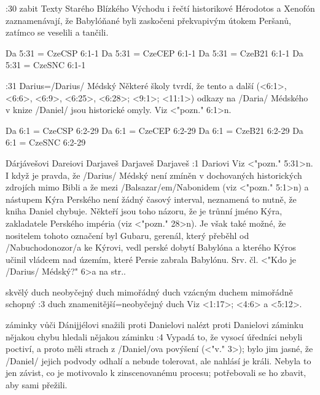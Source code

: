 :30 {zabit} Texty Starého Blízkého Východu i řečtí historikové Hérodotos a Xenofón zaznamenávají, že Babylóňané byli zaskočeni překvapivým útokem Peršanů, zatímco se veselili a tančili.

\renum Da 5:31 = CzeCSP 6:1-1
\renum Da 5:31 = CzeCEP 6:1-1
\renum Da 5:31 = CzeB21 6:1-1
\renum Da 5:31 = CzeSNC 6:1-1 

:31 {Darius}={\x/Darius/ Médský} Některé školy tvrdí, že tento a další 
(<6:1>, <6:6>, <6:9>, <6:25>, <6:28>; <9:1>; <11:1>)     
odkazy na \x/Daria/ Médského v knize \x/Daniel/ jsou historické omyly. Viz <"pozn." 6:1>n. 

\renum Da 6:1 = CzeCSP 6:2-29
\renum Da 6:1 = CzeCEP 6:2-29
\renum Da 6:1 = CzeB21 6:2-29
\renum Da 6:1 = CzeSNC 6:2-29

    {Dárjávešovi}   %
    {Dareiovi}   %
    {Darjaveš}  %
    {Darjaveš}  %
    {Darjaveš}   %
:1 {Dariovi} Viz <"pozn." 5:31>n.      
I když je pravda, že \x/Darius/ Médský není zmíněn v dochovaných historických zdrojích mimo Bibli a že mezi \x/Balsazar/em/Nabonidem (viz <"pozn." 5:1>n) a nástupem Kýra Perského není žádný časový interval, neznamená to nutně, že kniha Daniel chybuje. Někteří jsou toho názoru, že  je trůnní jméno Kýra, zakladatele Perského impéria (viz <"pozn." 28>n). 
Je však také možné, že nositelem tohoto označení byl Gubaru, gerenál, který přeběhl od  \x/Nabuchodonozor/a ke Kýrovi, vedl perské dobytí Babylóna a kterého  Kýros učinil vládcem nad územím, které Persie zabrala Babylónu. 
Srv. čl. <"Kdo je \x/Darius/ Médský?" 6>a na str.\pg.


    {skvělý duch}   %
    {neobyčejný duch}   %
    {mimořádný duch}  %
    {vzácným duchem}  %
    {mimořádně schopný}   %
:3 {duch znamenitější}={neobyčejný duch} Viz  <1:17>;  <4:6> a <5:12>.



    {záminky vůči Dánijjélovi} %
    {snažili proti Danielovi nalézt}  %
    {proti Danielovi záminku} %
    {nějakou chybu}  %
    {hledali nějakou záminku}  %
:4 {} Vypadá to, že vysocí úředníci nebyli poctiví, a proto měli strach z \x/Daniel/ova povýšení (<"v." 3>); bylo jim jasné, že  \x/Daniel/ jejich podvody odhalí a nebude tolerovat, ale nahlásí je králi. Nebyla to jen závist, co je motivovalo k zinscenovanému procesu; potřebovali se ho zbavit, aby sami přežili.


